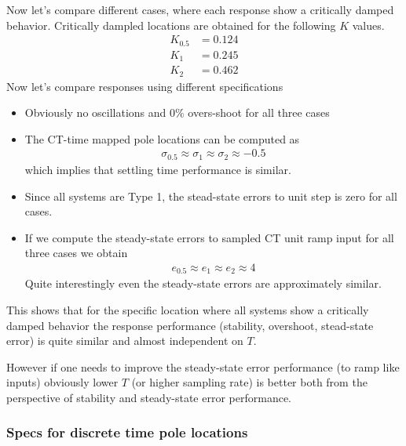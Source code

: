 \documentclass[twoside]{article}
\begin{document}
Now let's compare different cases, where each response
show a critically damped
behavior. Critically dampled locations are obtained for
the following $K$ values. 
%
\begin{align*}
  K_{0.5} &= 0.124 \\
  K_{1} &= 0.245 \\
  K_{2} &= 0.462
\end{align*}
%
Now let's compare responses using different specifications
%
\begin{itemize}
  \item Obviously no oscillations and $0 \%$ overs-shoot for all three
    cases
  \item The CT-time mapped pole locations can be computed as
   \begin{align*}
  \sigma_{0.5} \approx \sigma_{1} \approx \sigma_{2} \approx -0.5
\end{align*}
    which implies that settling time performance is similar.

   \item Since all systems are Type 1, the stead-state errors to unit
     step is zero for all cases.

   \item If we compute the steady-state errors to sampled CT 
    unit ramp input for all three cases we obtain
%
\begin{align*}
e_{0.5} \approx e_{1} \approx e_{2} \approx 4
\end{align*}
%
Quite interestingly even the steady-state errors are
approximately similar. 
%
\end{itemize}
%
This shows that for the specific location where all
systems show a critically damped behavior
the response performance (stability, overshoot, stead-state error) 
is quite similar and almost independent on $T$. 

However if one needs to improve the steady-state
error performance (to ramp like inputs) obviously
lower $T$ (or higher sampling rate) is better
both from the perspective of stability and steady-state
error performance.



\subsubsection*{Specs for discrete time pole locations}
\end{document}
